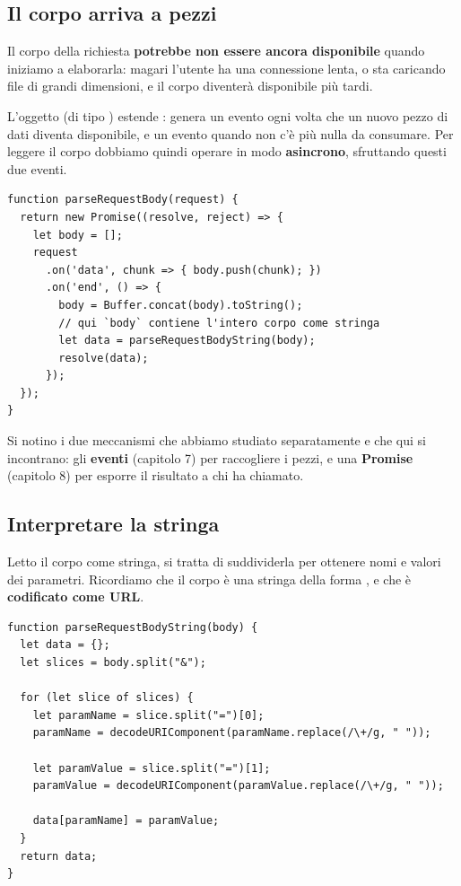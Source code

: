 \subsection{Il corpo arriva a pezzi}

Il corpo della richiesta \textbf{potrebbe non essere ancora disponibile} quando
iniziamo a elaborarla: magari l'utente ha una connessione lenta, o sta caricando
file di grandi dimensioni, e il corpo diventerà disponibile più tardi.

L'oggetto  (di tipo ) estende
: genera un evento  ogni volta che un nuovo
pezzo di dati diventa disponibile, e un evento  quando non c'è più
nulla da consumare. Per leggere il corpo dobbiamo quindi operare in modo
\textbf{asincrono}, sfruttando questi due eventi.

\begin{lstlisting}[style=js, name=body-parser.js]
function parseRequestBody(request) {
  return new Promise((resolve, reject) => {
    let body = [];
    request
      .on('data', chunk => { body.push(chunk); })
      .on('end', () => {
        body = Buffer.concat(body).toString();
        // qui `body` contiene l'intero corpo come stringa
        let data = parseRequestBodyString(body);
        resolve(data);
      });
  });
}
\end{lstlisting}

Si notino i due meccanismi che abbiamo studiato separatamente e che qui si
incontrano: gli \textbf{eventi} (capitolo 7) per raccogliere i pezzi, e una
\textbf{Promise} (capitolo 8) per esporre il risultato a chi ha chiamato.

\subsection{Interpretare la stringa}

Letto il corpo come stringa, si tratta di suddividerla per ottenere nomi e
valori dei parametri. Ricordiamo che il corpo è una stringa della forma
, e che è \textbf{codificato come URL}.

\begin{lstlisting}[style=js, name=body-parser.js]
function parseRequestBodyString(body) {
  let data = {};
  let slices = body.split("&");

  for (let slice of slices) {
    let paramName = slice.split("=")[0];
    paramName = decodeURIComponent(paramName.replace(/\+/g, " "));

    let paramValue = slice.split("=")[1];
    paramValue = decodeURIComponent(paramValue.replace(/\+/g, " "));

    data[paramName] = paramValue;
  }
  return data;
}
\end{lstlisting}

